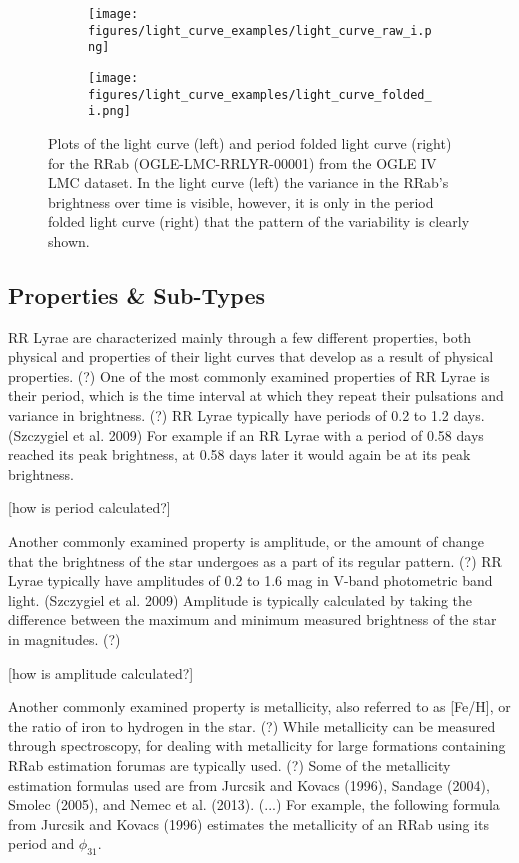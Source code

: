 \documentclass[]{article}
\begin{document}
\begin{figure}
	\centering
	\begin{subfigure}{.5\textwidth}
		\centering
		\texttt{[image: figures/light\_curve\_examples/light\_curve\_raw\_i.png]}
		\label{fig:light_curve_raw_i}
	\end{subfigure}%
	\begin{subfigure}{.5\textwidth}
		\centering
		\texttt{[image: figures/light\_curve\_examples/light\_curve\_folded\_i.png]}
		\label{fig:sub2}
	\end{subfigure}
	\caption{Plots of the light curve (left) and period folded light curve (right) for the RRab (OGLE-LMC-RRLYR-00001) from the OGLE IV LMC dataset. In the light curve (left) the variance in the RRab’s brightness over time is visible, however, it is only in the period folded light curve (right) that the pattern of the variability is clearly shown.}
	\label{fig:light_curves}
\end{figure}

\subsection{Properties \& Sub-Types}

RR Lyrae are characterized mainly through a few different properties, both physical and properties of their light curves that develop as a result of physical properties. (?) One of the most commonly examined properties of RR Lyrae is their period, which is the time interval at which they repeat their pulsations and variance in brightness. (?) RR Lyrae typically have periods of 0.2 to 1.2 days. (Szczygiel et al. 2009) For example if an RR Lyrae with a period of 0.58 days reached its peak brightness, at 0.58 days later it would again be at its peak brightness.

[how is period calculated?]

Another commonly examined property is amplitude, or the amount of change that the brightness of the star undergoes as a part of its regular pattern. (?) RR Lyrae typically have amplitudes of 0.2 to 1.6 mag in V-band photometric band light. (Szczygiel et al. 2009) Amplitude is typically calculated by taking the difference between the maximum and minimum measured brightness of the star in magnitudes. (?)

[how is amplitude calculated?]

Another commonly examined property is metallicity, also referred to as [Fe/H], or the ratio of iron to hydrogen in the star. (?) While metallicity can be measured through spectroscopy, for dealing with metallicity for large formations containing RRab estimation forumas are typically used. (?) Some of the metallicity estimation formulas used are from Jurcsik and Kovacs (1996), Sandage (2004), Smolec (2005), and Nemec et al. (2013). (...) \cite{jurcsik_1996, sandage_2004, smolec_2005, nemec_2013} For example, the following formula from Jurcsik and Kovacs (1996) estimates the metallicity of an RRab using its period and $\phi_{31}$. \cite{jurcsik_1996}
\end{document}
